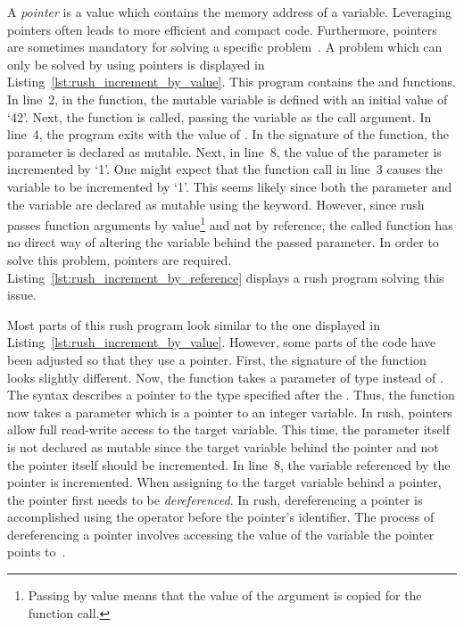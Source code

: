 
A \emph{pointer} is a value which contains the memory address of a variable.
Leveraging pointers often leads to more efficient and compact code.
Furthermore, pointers are sometimes mandatory for solving a specific problem~\cite[p.~93]{Ritchie1988}.
A problem which can only be solved by using pointers is displayed in Listing~\ref{lst:rush_increment_by_value}.
This program contains the  and  functions.
In line~2, in the  function, the mutable variable  is defined with an initial value of `42'.
Next, the  function is called, passing the variable as the call argument.
In line~4, the program exits with the value of .
In the signature of the  function, the  parameter is declared as mutable.
Next, in line~8, the value of the parameter is incremented by `1'.
One might expect that the function call in line~3 causes the variable  to be incremented by `1'.
This seems likely since both the parameter and the variable are declared as mutable using the  keyword.
However, since rush passes function arguments by value\footnote{Passing by value means that the value of the argument is copied for the function call.} and not by reference, the called function has no direct way of altering the variable behind the passed parameter.
In order to solve this problem, pointers are required.
Listing~\ref{lst:rush_increment_by_reference} displays a rush program solving this issue.


Most parts of this rush program look similar to the one displayed in Listing~\ref{lst:rush_increment_by_value}.
However, some parts of the code have been adjusted so that they use a pointer.
First, the signature of the  function looks slightly different.
Now, the function takes a parameter of type  instead of .
The syntax  describes a pointer to the type specified after the \qVerb{*}.
Thus, the function now takes a parameter which is a pointer to an integer variable.
In rush, pointers allow full read-write access to the target variable.
This time, the parameter itself is not declared as mutable since the target variable behind the pointer and not the pointer itself should be incremented.
In line~8, the variable referenced by the pointer is incremented.
When assigning to the target variable behind a pointer, the pointer first needs to be \emph{dereferenced}.
In rush, dereferencing a pointer is accomplished using the \qVerb{*} operator before the pointer's identifier.
The process of dereferencing a pointer involves accessing the value of the variable the pointer points to~\cite[p.~94]{Ritchie1988}.

